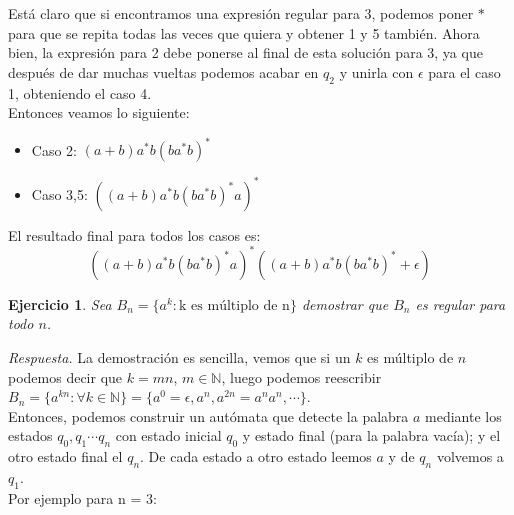 \documentclass[11pt]{article}
\theoremstyle{ejercicio-style}
\newtheorem{ejer}{Ejercicio}
\begin{document}
Está claro que si encontramos una expresión regular para 3, podemos poner $*$ para que se repita todas las veces que quiera y obtener 1 y 5 también. Ahora bien, la expresión para 2 debe ponerse al final de esta solución para 3, ya que después de dar muchas vueltas podemos acabar en $q_2$ y unirla con $\epsilon$ para el caso 1, obteniendo el caso 4. \\

Entonces veamos lo siguiente:
	\begin{itemize}
		\item Caso 2: $(a+b)a^*b{(ba^*b)}^*$
		\item Caso 3,5: ${((a+b)a^*b{(ba^*b)}^*a)}^*$
	\end{itemize}
	
El resultado final para todos los casos es:
$$ {((a+b)a^*b{(ba^*b)}^*a)}^*((a+b)a^*b{(ba^*b)}^* + \epsilon )$$

\newpage

\begin{ejer}
Sea $B_n = \{ a^k : \text{k es múltiplo de n} \}$ demostrar que $B_n$ es regular para todo $n$.
\end{ejer}

\emph{Respuesta.} La demostración es sencilla, vemos que si un $k$ es múltiplo de $n$ podemos decir que $k = mn$, $m \in \mathbb{N}$, luego podemos reescribir $B_n = \{ a^{kn} : \forall k \in \mathbb{N} \} = \{ a^0 = \epsilon, a^n, a^{2n}=a^na^n, \dotsb \}$. \\

Entonces, podemos construir un autómata que detecte la palabra $a$ mediante los estados $q_0, q_1 \dotsb q_n$ con estado inicial $q_0$ y estado final (para la palabra vacía); y el otro estado final el $q_n$. De cada estado a otro estado leemos $a$ y de $q_n$ volvemos a $q_1$. \\

Por ejemplo para n = 3:

\begin{center}
\end{center}
\end{document}
